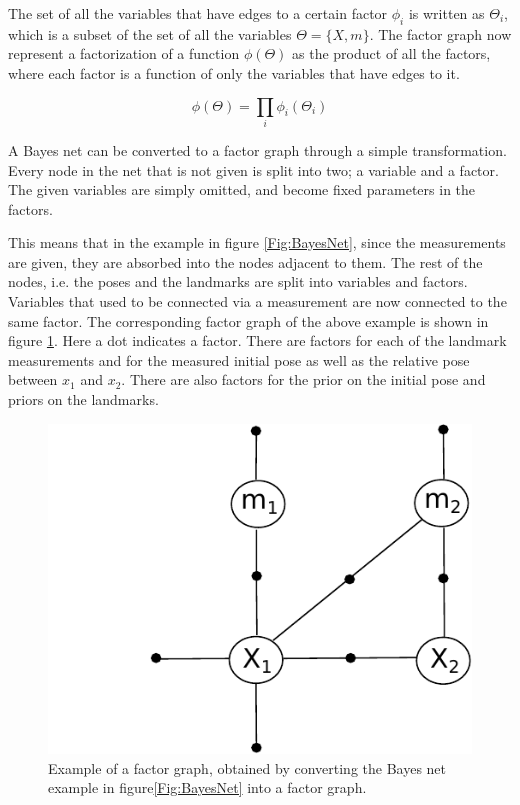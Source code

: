 The set of all the variables that have edges to a certain factor $\phi_i$ is written as $\Theta_i$, which is a subset of the set of all the variables $\Theta = \{X,m\}$. The factor graph now represent a factorization of a function $\phi(\Theta)$ as the product of all the factors, where each factor is a function of only the variables that have edges to it.

\begin{equation}
    \phi(\Theta) = \prod_i \phi_i(\Theta_i)
\end{equation}

A Bayes net can be converted to a factor graph through a simple transformation. Every node in the net that is not given is split into two; a variable and a factor. The given variables are simply omitted, and become fixed parameters in the factors. 

This means that in the example in figure \ref{Fig:BayesNet}, since the measurements are given, they are absorbed into the nodes adjacent to them. The rest of the nodes, i.e. the poses and the landmarks are split into variables and factors. Variables that used to be connected via a measurement are now connected to the same factor. The corresponding factor graph of the above example is shown in figure \ref{Fig:FactorGraph}. Here a dot indicates a factor. There are factors for each of the landmark measurements and for the measured initial pose as well as the relative pose between $x_1$ and $x_2$. There are also factors for the prior on the initial pose and priors on the landmarks.

\begin{figure}
    \centering
    \includegraphics[width=0.8\linewidth]{0_Images/3_Background/FactorGraph.pdf}
    \caption[Example of a Bayes net.]
    {Example of a factor graph, obtained by converting the Bayes net example in figure\ref{Fig:BayesNet} into a factor graph.}
    \label{Fig:FactorGraph}
\end{figure}

